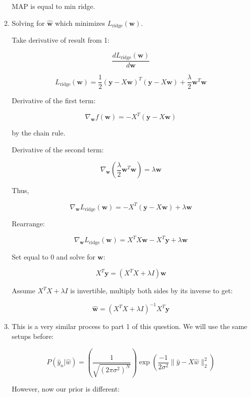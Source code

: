 \documentclass[submit]{../harvardml}
\begin{document}
\begin{tcolorbox}[title=Solution, colback=white, colframe=black, breakable]
\begin{enumerate}
MAP is equal to min ridge.




      \item 
      
      Solving for \( \mathbf{\hat{w}} \) which minimizes \( L_{\text{ridge}} (\mathbf{w}) \).

Take derivative of result from 1:

\[
\frac{dL_{\text{ridge}} (\mathbf{w})}{d\mathbf{w}}
\]

\[
L_{\text{ridge}} (\mathbf{w}) = \frac{1}{2} (\mathbf{y} - X\mathbf{w})^T (\mathbf{y} - X\mathbf{w}) + \frac{\lambda}{2} \mathbf{w}^T \mathbf{w}
\]

Derivative of the first term:

\[
\nabla_{\mathbf{w}} f(\mathbf{w}) = -X^T (\mathbf{y} - X\mathbf{w})
\]

by the chain rule.

Derivative of the second term:

\[
\nabla_{\mathbf{w}} \left( \frac{\lambda}{2} \mathbf{w}^T \mathbf{w} \right) = \lambda \mathbf{w}
\]

Thus,

\[
\nabla_{\mathbf{w}} L_{\text{ridge}} (\mathbf{w}) = -X^T (\mathbf{y} - X\mathbf{w}) + \lambda \mathbf{w}
\]

Rearrange:

\[
\nabla_{\mathbf{w}} L_{\text{ridge}} (\mathbf{w}) = X^T X \mathbf{w} - X^T \mathbf{y} + \lambda \mathbf{w}
\]

Set equal to 0 and solve for \( \mathbf{w} \):

\[
X^T \mathbf{y} = (X^T X + \lambda I) \mathbf{w}
\]

Assume \( X^T X + \lambda I \) is invertible, multiply both sides by its inverse to get:

\[
\mathbf{\hat{w}} = (X^T X + \lambda I)^{-1} X^T \mathbf{y}
\]





      \item 
      
      This is a very similar process to part 1 of this question. We will use the same setups before:

      \[
      P(\hat{y}_n | \hat{w}) = \left( \frac{1}{\sqrt{(2\pi \sigma^2)^N}} \right) \exp \left( \frac{-1}{2\sigma^2} \| \hat{y} - X\hat{w} \|_2^2 \right)
      \]
      
      However, now our prior is different:
      

\end{enumerate}
\end{tcolorbox}
\end{document}
